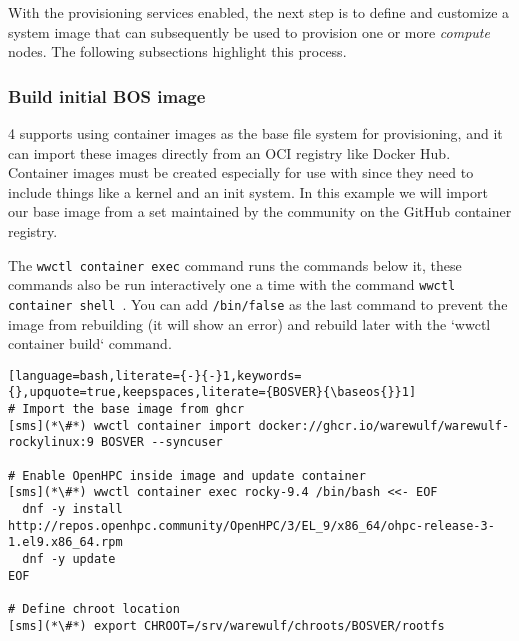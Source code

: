 With the provisioning services enabled, the next step is to define and
customize a system image that can subsequently be used to provision one or more
{\em compute} nodes. The following subsections highlight this process.

\subsubsection{Build initial BOS image} \label{sec:assemble_bos}
\Warewulf{} 4 supports using container images as the base file system for 
provisioning, and it can import these images directly from an OCI registry like
Docker Hub. Container images must be created especially for use with \Warewulf{}
since they need to include things like a kernel and an init system. In this 
example we will import our base image from a set maintained by the \Warewulf{}
community on the GitHub container registry.

The \texttt{wwctl container exec} command runs the commands below it, these commands 
also be run interactively one a time with the command \texttt{wwctl container 
shell \baseos{}}. You can add \texttt{/bin/false} as the last command to prevent 
the image from rebuilding (it will show an error) and rebuild later with the 
`wwctl container build` command.

\begin{lstlisting}[language=bash,literate={-}{-}1,keywords={},upquote=true,keepspaces,literate={BOSVER}{\baseos{}}1]
# Import the base image from ghcr
[sms](*\#*) wwctl container import docker://ghcr.io/warewulf/warewulf-rockylinux:9 BOSVER --syncuser

# Enable OpenHPC inside image and update container
[sms](*\#*) wwctl container exec rocky-9.4 /bin/bash <<- EOF
  dnf -y install http://repos.openhpc.community/OpenHPC/3/EL_9/x86_64/ohpc-release-3-1.el9.x86_64.rpm
  dnf -y update
EOF

# Define chroot location 
[sms](*\#*) export CHROOT=/srv/warewulf/chroots/BOSVER/rootfs
\end{lstlisting}
